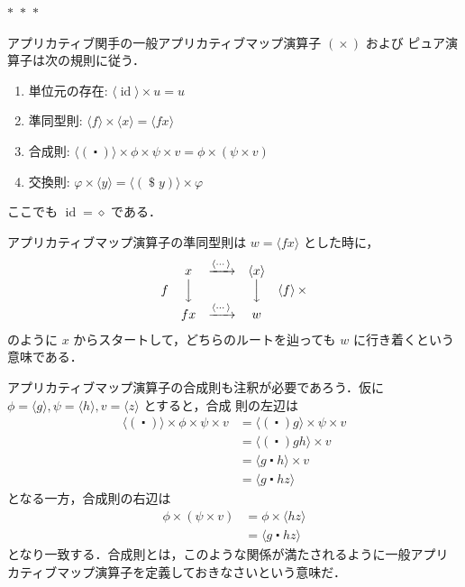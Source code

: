 \documentclass[a5paper,twoside,fleqn]{jsbook}
\newcommand{\separator}{\begin{center}$*$~$*$~$*$\end{center}}
\newcommand{\mAnonParam}{\diamond}
\DeclareMathOperator{\mId}{id}
\DeclareMathOperator{\mApply}{\$}
\DeclareMathOperator{\mAppMap}{\times}
\DeclareMathOperator{\mComp}{\centerdot}
\DeclareMathOperator{\mMap}{\bullet}
\newcommand{\mPureWith}[1]{\langle#1\rangle}
\begin{document}
\separator

アプリカティブ関手の一般アプリカティブマップ演算子 $(\mAppMap)$ および
ピュア演算子は次の規則に従う．
\begin{enumerate}
\item 単位元の存在: $\mPureWith{\mId}\mAppMap u=u$
\item 準同型則: $\mPureWith{f}\mAppMap\mPureWith{x}=\mPureWith{fx}$
\item 合成則: $\mPureWith{(\mComp)}\mAppMap\phi\mAppMap\psi\mAppMap v=\phi\mAppMap{}(\psi\mAppMap v)$
\item 交換則: $\varphi\mAppMap\mPureWith{y}=\mPureWith{(\mApply y)}\mAppMap\varphi$
\end{enumerate}
ここでも $\mId=\mAnonParam$ である．

アプリカティブマップ演算子の準同型則は $w=\mPureWith{fx}$ とした時に，
\begin{equation}
\begin{matrix}
&x&\xrightarrow{\mPureWith{\dotsb}}&\mPureWith{x}\\
f&\Big\downarrow&&\Big\downarrow&\mPureWith{f}\mAppMap\\
&fx&\xrightarrow{\mPureWith{\dotsb}}&w
\end{matrix}
\end{equation}
のように $x$ からスタートして，どちらのルートを辿っても $w$ に行き着くという意味である．

アプリカティブマップ演算子の合成則も注釈が必要であろう．仮に
$\phi=\mPureWith{g},\psi=\mPureWith{h},v=\mPureWith{z}$ とすると，合成
則の左辺は
\begin{align}
\mPureWith{(\mComp)}\mAppMap\phi\mAppMap\psi\mAppMap v
&=\mPureWith{(\mComp)g}\mAppMap\psi\mAppMap v\\
&=\mPureWith{(\mComp)gh}\mAppMap v\\
&=\mPureWith{g\mComp h}\mAppMap v\\
&=\mPureWith{g\mComp hz}
\end{align}
となる一方，合成則の右辺は
\begin{align}
\phi\mAppMap{}(\psi\mAppMap v)
&=\phi\mAppMap\mPureWith{hz}\\
&=\mPureWith{g\mComp hz}
\end{align}
となり一致する．合成則とは，このような関係が満たされるように一般アプリ
カティブマップ演算子を定義しておきなさいという意味だ．
\end{document}
